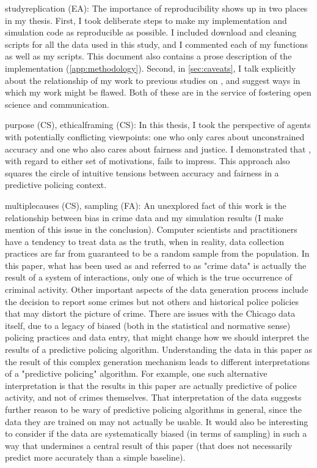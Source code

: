 \begin{itemize}

\hashtag studyreplication (EA): The importance of reproducibility shows up in two places in my thesis. First, I took deliberate steps to make my implementation and simulation code as reproducible as possible. I included download and cleaning scripts for all the data used in this study, and I commented each of my functions as well as my scripts. This document also contains a prose description of the implementation (\autoref{app:methodology}). Second, in \autoref{sec:caveats}, I talk explicitly about the relationship of my work to previous studies on \pp, and suggest ways in which my work might be flawed. Both of these are in the service of fostering open science and communication.

\hashtag purpose (CS), ethicalframing (CS): In this thesis, I took the perspective of agents with potentially conflicting viewpoints: one who only cares about unconstrained accuracy and one who also cares about fairness and justice. I demonstrated that \pp, with regard to either set of motivations, fails to impress. This approach also squares the circle of intuitive tensions between accuracy and fairness in a predictive policing context.

\hashtag multiplecauses (CS), sampling (FA): An unexplored fact of this work is the relationship between bias in crime data and my simulation results (I make mention of this issue in the conclusion). Computer scientists and practitioners have a tendency to treat data as the truth, when in reality, data collection practices are far from guaranteed to be a random sample from the population. In this paper, what has been used as and referred to as "crime data" is actually the result of a system of interactions, only one of which is the true occurrence of criminal activity. Other important aspects of the data generation process include the decision to report some crimes but not others and historical police policies that may distort the picture of crime. There are issues with the Chicago data itself, due to a legacy of biased (both in the statistical and normative sense) policing practices and data entry, that might change how we should interpret the results of a predictive policing algorithm. Understanding the data in this paper as the result of this complex generation mechanism leads to different interpretations of a "predictive policing" algorithm. For example, one such alternative interpretation is that the results in this paper are actually predictive of police activity, and not of crimes themselves. That interpretation of the data suggests further reason to be wary of predictive policing algorithms in general, since the data they are trained on may not actually be usable. It would also be interesting to consider if the data are systematically biased (in terms of sampling) in such a way that undermines a central result of this paper (that \pp does not necessarily predict more accurately than a simple baseline).


\end{itemize}
